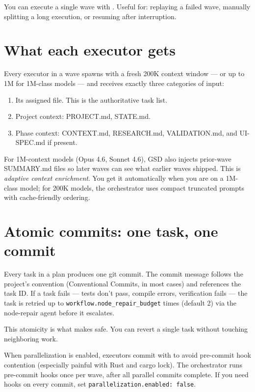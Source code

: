 \documentclass[11pt,letterpaper,openany]{book}
\begin{document}
You can execute a single wave with . Useful for: replaying a failed wave, manually splitting a long execution, or resuming after interruption.

\section{What each executor gets}

Every executor in a wave spawns with a fresh 200K context window --- or up to 1M for 1M-class models --- and receives exactly three categories of input:

\begin{enumerate}[itemsep=2pt]
  \item Its assigned  file. This is the authoritative task list.
  \item Project context: PROJECT.md, STATE.md.
  \item Phase context: CONTEXT.md, RESEARCH.md, VALIDATION.md, and UI-SPEC.md if present.
\end{enumerate}

For 1M-context models (Opus 4.6, Sonnet 4.6), GSD also injects prior-wave SUMMARY.md files so later waves can see what earlier waves shipped. This is \emph{adaptive context enrichment}. You get it automatically when you are on a 1M-class model; for 200K models, the orchestrator uses compact truncated prompts with cache-friendly ordering.

\section{Atomic commits: one task, one commit}

Every task in a plan produces one git commit. The commit message follows the project's convention (Conventional Commits, in most cases) and references the task ID. If a task fails --- tests don't pass, compile errors, verification fails --- the task is retried up to \texttt{workflow.node\_repair\_budget} times (default 2) via the node-repair agent before it escalates.

This atomicity is what makes  safe. You can revert a single task without touching neighboring work.

\begin{gsdtip}
When parallelization is enabled, executors commit with \texttt{} to avoid pre-commit hook contention (especially painful with Rust and cargo lock). The orchestrator runs pre-commit hooks once per wave, after all parallel commits complete. If you need hooks on every commit, set \texttt{parallelization.enabled: false}.
\end{gsdtip}
\end{document}
